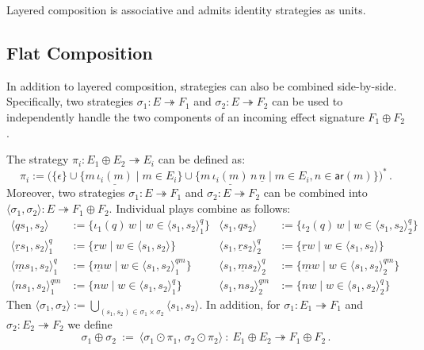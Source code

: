\documentclass[acmsmall,nonacm]{acmart}
\newcommand{\kw}[1]{\ensuremath{ \mathsf{#1} }}
\begin{document}
\begin{theorem}
Layered composition is associative
and admits identity strategies as units.
\end{theorem}


\subsection{Flat Composition} %

In addition to layered composition,
strategies can also be combined side-by-side.
Specifically, two strategies
$\sigma_1 : E \twoheadrightarrow F_1$ and
$\sigma_2 : E \twoheadrightarrow F_2$
can be used to independently handle
the two components of an incoming effect signature $F_1 \oplus F_2$.

\begin{definition} %
The strategy $\pi_i : E_1 \oplus E_2 \twoheadrightarrow E_i$
can be defined as:
\[
  \pi_i := \bigl(
    \{ \epsilon \} \cup
    \{ m \, \underline{\iota_i(m)} \mid m \in E_i \} \cup
    \{ m \, \underline{\iota_i(m)} \, n \, \underline{n} \mid
       m \in E_i, n \in \kw{ar}(m) \}
  \big)^*
  \,.
\]
Moreover,
two strategies
$\sigma_1 : E \twoheadrightarrow F_1$ and
$\sigma_2 : E \twoheadrightarrow F_2$
can be combined into
$\langle \sigma_1, \sigma_2 \rangle : E \twoheadrightarrow F_1 \oplus F_2$.
Individual plays combine as follows:
\begin{align*}
  \langle qs_1 , s_2 \rangle &:=
    \{ \iota_1(q) \, w \mid w \in \langle s_1, s_2 \rangle^q_1 \} &
  \langle s_1 , qs_2 \rangle &:=
    \{ \iota_2(q) \, w \mid w \in \langle s_1, s_2 \rangle^q_2 \}
  \\
  \langle \underline{r} s_1, s_2 \rangle_1^q &:=
    \{ \underline{r} w \mid w \in \langle s_1, s_2 \rangle \} &
  \langle s_1, \underline{r} s_2 \rangle_2^q &:=
    \{ \underline{r} w \mid w \in \langle s_1, s_2 \rangle \}
  \\
  \langle \underline{m} s_1, s_2 \rangle_1^q &:=
    \{ \underline{m} w \mid w \in \langle s_1, s_2 \rangle^{qm}_1 \} &
  \langle s_1, \underline{m} s_2 \rangle_2^q &:=
    \{ \underline{m} w \mid w \in \langle s_1, s_2 \rangle^{qm}_2 \}
  \\
  \langle n s_1, s_2 \rangle^{qm}_1 &:=
    \{ n w \mid w \in \langle s_1, s_2 \rangle^q_1 \} &
  \langle s_1, n s_2 \rangle^{qm}_2 &:=
    \{ n w \mid w \in \langle s_1, s_2 \rangle^q_2 \}
\end{align*}
Then
$\langle \sigma_1, \sigma_2 \rangle :=
 \bigcup_{(s_1, s_2) \in \sigma_1 \times \sigma_2}
   \langle s_1, s_2 \rangle$.
In addition,
for $\sigma_1 : E_1 \twoheadrightarrow F_1$ and
$\sigma_2 : E_2 \twoheadrightarrow F_2$
we define
\[
  \sigma_1 \oplus \sigma_2 \: := \:
    \langle \sigma_1 \odot \pi_1, \, \sigma_2 \odot \pi_2 \rangle
    \: : \:
    E_1 \oplus E_2 \twoheadrightarrow F_1 \oplus F_2
  \,.
\]
\end{definition}
\end{document}
